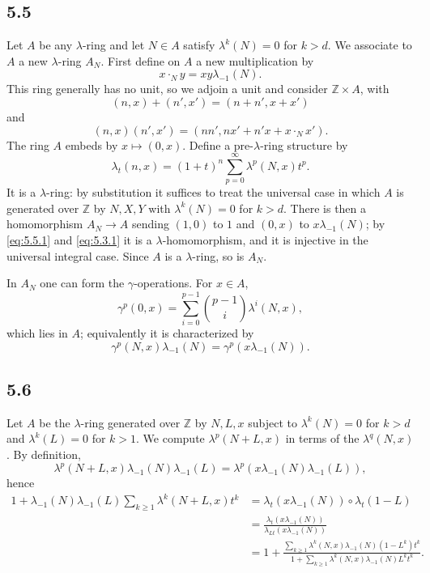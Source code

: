 \documentclass[13pt]{extarticle}
\newcommand{\ZZ}{\mathbb Z}
\begin{document}
\subsection*{5.5}
Let $A$ be any $\lambda$-ring and let $N\in A$ satisfy $\lambda^k(N)=0$ for $k>d$. We associate to $A$ a new $\lambda$-ring $A_N$. First define on $A$ a new multiplication by
\begin{equation}\label{eq:5.5.1}
x\cdot_N y=xy\lambda_{-1}(N).
\end{equation}
This ring generally has no unit, so we adjoin a unit and consider $\ZZ\times A$, with
\[
(n,x)+(n',x')=(n+n',x+x')
\]
and
\begin{equation}\label{eq:5.5.2}
(n,x)(n',x')=(nn',nx'+n'x+x\cdot_N x').
\end{equation}
The ring $A$ embeds by $x\mapsto(0,x)$. Define a pre-$\lambda$-ring structure by
\begin{equation}\label{eq:5.5.3}
\lambda_t(n,x)=(1+t)^n\sum_{p=0}^{\infty}\lambda^p(N,x)t^p.
\end{equation}
It is a $\lambda$-ring: by substitution it suffices to treat the universal case in which $A$ is generated over $\ZZ$ by $N,X,Y$ with $\lambda^k(N)=0$ for $k>d$. There is then a homomorphism $A_N\to A$ sending $(1,0)$ to $1$ and $(0,x)$ to $x\lambda_{-1}(N)$; by \eqref{eq:5.5.1} and \eqref{eq:5.3.1} it is a $\lambda$-homomorphism, and it is injective in the universal integral case. Since $A$ is a $\lambda$-ring, so is $A_N$.

In $A_N$ one can form the $\gamma$-operations. For $x\in A$,
\[
\gamma^p(0,x)=\sum_{i=0}^{p-1}\binom{p-1}{i}\lambda^i(N,x),
\]
which lies in $A$; equivalently it is characterized by
\begin{equation}\label{eq:5.5.4}
\gamma^p(N,x)\lambda_{-1}(N)=\gamma^p(x\lambda_{-1}(N)).
\end{equation}

\subsection*{5.6}
Let $A$ be the $\lambda$-ring generated over $\ZZ$ by $N,L,x$ subject to $\lambda^k(N)=0$ for $k>d$ and $\lambda^k(L)=0$ for $k>1$. We compute $\lambda^p(N+L,x)$ in terms of the $\lambda^q(N,x)$. By definition,
\[
\lambda^p(N+L,x)\lambda_{-1}(N)\lambda_{-1}(L)=\lambda^p(x\lambda_{-1}(N)\lambda_{-1}(L)),
\]
hence
\begin{align*}
1+\lambda_{-1}(N)\lambda_{-1}(L)\sum_{k\geq 1}\lambda^k(N+L,x)t^k
&=\lambda_t(x\lambda_{-1}(N))\circ\lambda_t(1-L)\\
&=\frac{\lambda_t(x\lambda_{-1}(N))}{\lambda_{Lt}(x\lambda_{-1}(N))}\\
&=1+\frac{\sum_{k\geq 1}\lambda^k(N,x)\lambda_{-1}(N)(1-L^k)t^k}{1+\sum_{k\geq 1}\lambda^k(N,x)\lambda_{-1}(N)L^kt^k}.
\end{align*}
\end{document}
